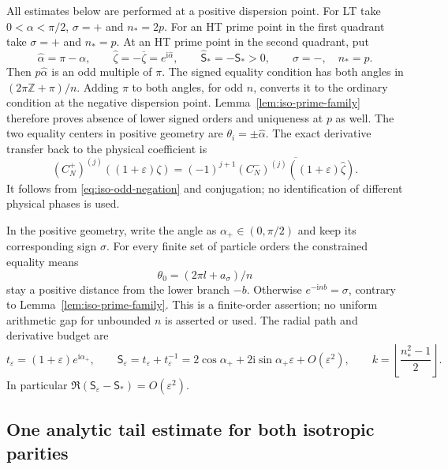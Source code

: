 \documentclass[11pt]{article}
\numberwithin{equation}{section}
\theoremstyle{definition}
\newcommand{\Z}{\mathbb Z}
\newcommand{\ii}{\mathrm i}
\newcommand{\eps}{\varepsilon}
\begin{document}
All estimates below are performed at a positive dispersion point.
For LT take $0<\alpha<\pi/2$, $\sigma=+$ and $n_*=2p$.
For an HT prime point in the first quadrant take
$\sigma=+$ and $n_*=p$.  At an HT prime point in the second quadrant,
put
\begin{equation}\label{eq:iso-negative-geometry}
 \widehat\alpha=\pi-\alpha,\qquad
 \widehat\zeta=-\overline\zeta=e^{\ii\widehat\alpha},\qquad
 \widehat{\mathsf S}_*=-\mathsf S_*>0,
 \qquad \sigma=-,\quad n_*=p.
\end{equation}
Then $p\widehat\alpha$ is an odd multiple of $\pi$.
The signed equality condition has both angles in
$(2\pi\Z+\pi)/n$.  Adding $\pi$ to both angles, for odd $n$,
converts it to the ordinary condition at the negative dispersion
point.  Lemma~\ref{lem:iso-prime-family} therefore proves absence of
lower signed orders and uniqueness at $p$ as well.  The two equality
centers in positive geometry are $\theta_i=\pm\widehat\alpha$.
The exact derivative transfer back to the physical coefficient is
\begin{equation}\label{eq:iso-negative-jets}
 (C_N^+)^{(j)}((1+\eps)\zeta)
  =(-1)^{j+1}
      \overline{(C_N^-)^{(j)}((1+\eps)\widehat\zeta)}.
\end{equation}
It follows from \eqref{eq:iso-odd-negation} and conjugation; no
identification of different physical phases is used.

In the positive geometry, write the angle as $\alpha_+\in(0,\pi/2)$
and keep its corresponding sign $\sigma$.
For every finite set of particle orders the constrained equality means
\[
 \theta_0=(2\pi l+a_\sigma)/n
\]
stay a positive distance from the lower branch $-b$.
Otherwise $e^{-\ii nb}=\sigma$, contrary to
Lemma~\ref{lem:iso-prime-family}.  This is a finite-order assertion;
no uniform arithmetic gap for unbounded $n$ is asserted or used.
The radial path and derivative budget are
\begin{equation}\label{eq:iso-budget}
 t_\eps=(1+\eps)e^{\ii\alpha_+},\qquad
 \mathsf S_\eps=t_\eps+t_\eps^{-1}
 =2\cos\alpha_++2\ii\sin\alpha_+\eps+O(\eps^2),
 \qquad
 k=\left\lfloor\frac{n_*^2-1}{2}\right\rfloor.
\end{equation}
In particular $\Re(\mathsf S_\eps-\mathsf S_*)=O(\eps^2)$.

\subsection{One analytic tail estimate for both isotropic parities}
\label{sec:iso-shared-tail}
\end{document}
